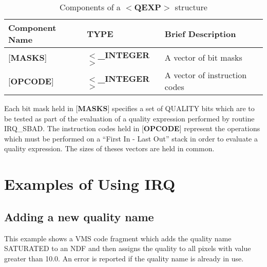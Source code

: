 \begin{table}[htb]
\centering
\caption{Components of a $<${\bf QEXP}$>$ structure}
\label{TAB:QEXP}
\begin{tabular}{|l|l|l|}
\hline
Component Name & TYPE & Brief Description \\ \hline
{[}{\bf MASKS}{]} & $<${\bf \_INTEGER}$>$ & A vector of bit masks\\
{[}{\bf OPCODE}{]} & $<${\bf \_INTEGER}$>$ & A vector of instruction codes\\
\hline
\end{tabular}
\end{table}

Each bit mask held in {[}{\bf MASKS}{]} specifies a set of QUALITY bits which
are to be tested as part of the evaluation of a quality expression performed by
routine IRQ\_SBAD. The instruction codes held in {[}{\bf OPCODE}{]} represent
the operations which must be performed on a ``First In - Last Out'' stack in
order to evaluate a quality expression. The sizes of theses vectors are held in
common.

\section {Examples of Using IRQ}
\newcommand{\numcir}[1]{\mbox{\hspace{3ex}$\bigcirc$\hspace{-1.7ex}{\small #1}}}
\label{APP:EXAMS}
\subsection {Adding a new quality name}
This example shows a VMS code fragment which adds the quality name SATURATED to an
NDF and then assigns the quality to all pixels with value greater than 10.0.
An error is reported if the quality name is already in use.

